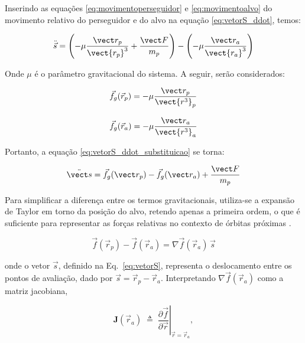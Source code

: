 Inserindo as equações \eqref{eq:movimentoperseguidor} e \eqref{eq:movimentoalvo} do movimento relativo do perseguidor e do alvo na equação \eqref{eq:vetorS_ddot}, temos:

\begin{equation}
\label{eq:vetorS_ddot_substituicao}
\ddot{\vec s} = \left(-\mu \frac{\vect r_{p}}{\vect {r_{p}}^3} + \frac{\vect F}{m_{p}}\right) - \left(-\mu \frac{\vect r_a}{\vect {r_a}^3}\right)
\end{equation}

Onde $\mu$ é o parâmetro gravitacional do sistema. A seguir, serão considerados:

\begin{equation}
    \label{eq:fg_rc}
\vec f_g(\vec r_{p}) = -\mu \frac{\vect r_{p}}{\vect {r^3}_{p}}
\end{equation}

\begin{equation}
    \label{eq:fg_rt}
\vec f_g(\vec r_a) = -\mu \frac{\vect r_a}{\vect {r^3}_a}
\end{equation}

Portanto, a equação \eqref{eq:vetorS_ddot_substituicao} se torna:

\begin{equation}
\label{eq:fg_rc_fg_rt}
\ddot{\vect s} = \vec f_g(\vect r_{p}) - \vec f_g(\vect r_{a}) + \frac{\vect F}{m_{p}}
\end{equation}

Para simplificar a diferença entre os termos gravitacionais, utiliza-se a expansão de Taylor em torno da posição do alvo, retendo apenas a primeira ordem, o que é suficiente para representar as forças relativas no contexto de órbitas próximas \cite{arantes2011}.

\begin{equation}
\label{eq:linearizandoJacobiana}
\vec f(\vec r_{p}) - \vec f(\vec r_{a}) = \nabla \vec f(\vec r_{a})\,\vec s
\end{equation}

onde o vetor $\vec s$, definido na Eq.~\eqref{eq:vetorS}, representa o deslocamento entre os pontos de avaliação, dado por
$\vec s = \vec r_{p} - \vec r_{a}$.
Interpretando $\nabla \vec f(\vec r_a)$ como a matriz jacobiana,

\begin{equation}
\mathbf{J}(\vec r_a) \;\triangleq\; \left.\frac{\partial \vec f}{\partial \vec r}\right|_{\vec r=\vec r_a},
\end{equation}

